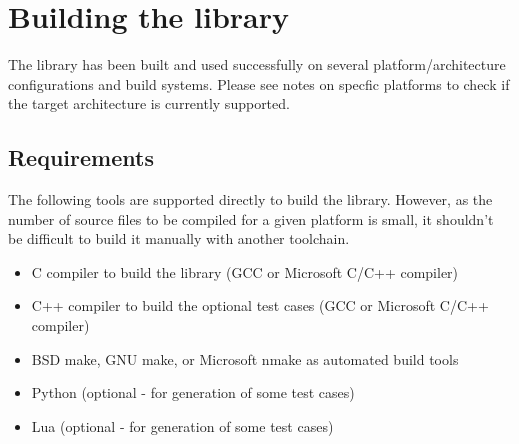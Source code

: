 %
%
%
%

\newpage
\section{Building the library}

The library has been built and used successfully on several 
platform/architecture configurations and build systems.
Please see notes on specfic platforms to check if the target
architecture is currently supported.


\subsection{Requirements}

The following tools are supported directly to build the  library.
However, as the number of source files to be compiled for a given
platform is small, it shouldn't be difficult to build it manually with
another toolchain.
\begin{itemize}
\item C compiler to build the  library (GCC or Microsoft C/C++ compiler)
\item C++ compiler to build the optional test cases (GCC or Microsoft C/C++ compiler)
\item BSD make, GNU make, or Microsoft nmake as automated build tools
\item Python (optional - for generation of some test cases)
\item Lua (optional - for generation of some test cases)
\end{itemize}


